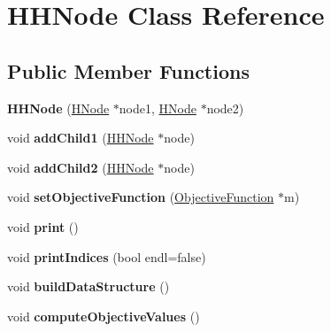 \hypertarget{classHHNode}{\section{H\-H\-Node Class Reference}
\label{classHHNode}
}
\subsection*{Public Member Functions}
\begin{DoxyCompactItemize}
\item 
\hypertarget{classHHNode_aab9f99d78f7bc97c6cf532c29cd30b54}{{\bfseries H\-H\-Node} (\hyperlink{classHNode}{H\-Node} $\ast$node1, \hyperlink{classHNode}{H\-Node} $\ast$node2)}\label{classHHNode_aab9f99d78f7bc97c6cf532c29cd30b54}

\item 
\hypertarget{classHHNode_a3cbb049e2e5716418da87d63bd171401}{void {\bfseries add\-Child1} (\hyperlink{classHHNode}{H\-H\-Node} $\ast$node)}\label{classHHNode_a3cbb049e2e5716418da87d63bd171401}

\item 
\hypertarget{classHHNode_a42f070f81e0f971f784971cc1068fcf0}{void {\bfseries add\-Child2} (\hyperlink{classHHNode}{H\-H\-Node} $\ast$node)}\label{classHHNode_a42f070f81e0f971f784971cc1068fcf0}

\item 
\hypertarget{classHHNode_ae1dd902682e627f49924f14b6a79ce70}{void {\bfseries set\-Objective\-Function} (\hyperlink{classObjectiveFunction}{Objective\-Function} $\ast$m)}\label{classHHNode_ae1dd902682e627f49924f14b6a79ce70}

\item 
\hypertarget{classHHNode_a961a2374c8e59fa5ba1c804ec43c1eb3}{void {\bfseries print} ()}\label{classHHNode_a961a2374c8e59fa5ba1c804ec43c1eb3}

\item 
\hypertarget{classHHNode_af046ef2a00e95a03a04e77a5c2b4ec98}{void {\bfseries print\-Indices} (bool endl=false)}\label{classHHNode_af046ef2a00e95a03a04e77a5c2b4ec98}

\item 
\hypertarget{classHHNode_abcac0447fdc91214c7320442d82b8ef6}{void {\bfseries build\-Data\-Structure} ()}\label{classHHNode_abcac0447fdc91214c7320442d82b8ef6}

\item 
\hypertarget{classHHNode_aa352895af58b5bb268e2ed3f84cf1f50}{void {\bfseries compute\-Objective\-Values} ()}\label{classHHNode_aa352895af58b5bb268e2ed3f84cf1f50}


\end{DoxyCompactItemize}
